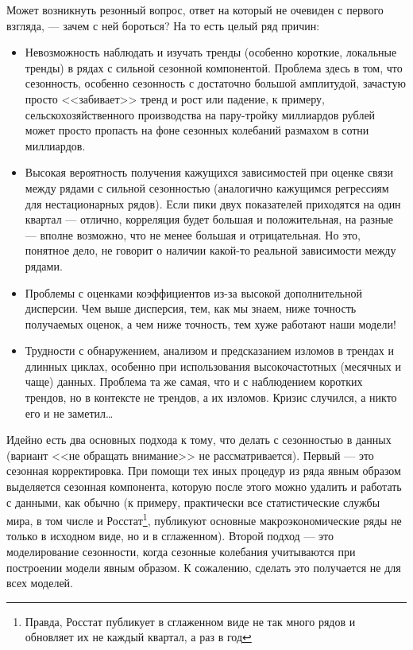 \documentclass[final,pdftex]{../../template/epsilonj}\usepackage[]{graphicx}\usepackage[]{color}
\begin{document}
Может возникнуть резонный вопрос, ответ на который не очевиден с первого взгляда, --- зачем с ней бороться? На то есть целый ряд причин:

\begin{itemize}
\item Невозможность наблюдать и изучать тренды (особенно короткие, локальные тренды) в рядах с сильной сезонной компонентой. Проблема здесь в том, что сезонность, особенно сезонность с достаточно большой амплитудой, зачастую просто <<забивает>> тренд и рост или падение, к примеру, сельскохозяйственного производства на пару-тройку миллиардов рублей может просто пропасть на фоне сезонных колебаний размахом в сотни миллиардов. 
\item Высокая вероятность получения кажущихся зависимостей при оценке связи между рядами с сильной сезонностью (аналогично кажущимся регрессиям для нестационарных рядов). Если пики двух показателей приходятся на один квартал --- отлично, корреляция будет большая и положительная, на разные --- вполне возможно, что не менее большая и отрицательная. Но это, понятное дело, не говорит о наличии какой-то реальной зависимости между рядами. 
\item Проблемы с оценками коэффициентов из-за высокой дополнительной дисперсии. Чем выше дисперсия, тем, как мы знаем, ниже точность получаемых оценок, а чем ниже точность, тем хуже работают наши модели!
\item Трудности с обнаружением, анализом и предсказанием изломов в трендах и длинных циклах, особенно при использования высокочастотных (месячных и чаще) данных. Проблема та же самая, что и с наблюдением коротких трендов, но в контексте не трендов, а их изломов. Кризис случился, а никто его и не заметил\ldots
\end{itemize}

Идейно есть два основных подхода к тому, что делать с сезонностью в данных (вариант <<не обращать внимание>> не рассматривается). Первый --- это сезонная корректировка. При помощи тех иных процедур из ряда явным образом выделяется сезонная компонента, которую после этого можно удалить и работать с данными, как обычно (к примеру, практически все статистические службы мира, в том числе и Росстат\footnote{Правда, Росстат публикует в сглаженном виде не так много рядов и обновляет их не каждый квартал, а раз в год}, публикуют основные макроэкономические ряды не только в исходном виде, но и в сглаженном). Второй подход --- это моделирование сезонности, когда сезонные колебания учитываются при построении модели явным образом. К сожалению, сделать это получается не для всех моделей. 
\end{document}
